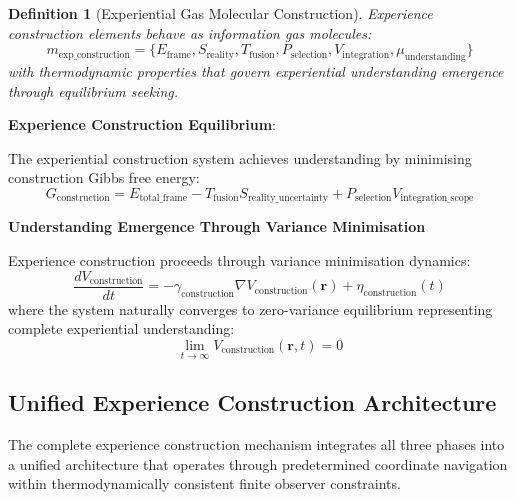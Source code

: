 \documentclass{article}
\newtheorem{definition}[theorem]{Definition}
\begin{document}
\begin{definition}[Experiential Gas Molecular Construction]
Experience construction elements behave as information gas molecules:
\begin{equation}
m_{\text{exp\_construction}} = \{E_{\text{frame}}, S_{\text{reality}}, T_{\text{fusion}}, P_{\text{selection}}, V_{\text{integration}}, \mu_{\text{understanding}}\}
\end{equation}
with thermodynamic properties that govern experiential understanding emergence through equilibrium seeking.
\end{definition}

\textbf{Experience Construction Equilibrium}:

The experiential construction system achieves understanding by minimising construction Gibbs free energy:
\begin{equation}
G_{\text{construction}} = E_{\text{total\_frame}} - T_{\text{fusion}} S_{\text{reality\_uncertainty}} + P_{\text{selection}} V_{\text{integration\_scope}}
\end{equation}

\textbf{Understanding Emergence Through Variance Minimisation}

Experience construction proceeds through variance minimisation dynamics:
\begin{equation}
\frac{dV_{\text{construction}}}{dt} = -\gamma_{\text{construction}} \nabla V_{\text{construction}}(\mathbf{r}) + \eta_{\text{construction}}(t)
\end{equation}
where the system naturally converges to zero-variance equilibrium representing complete experiential understanding:
\begin{equation}
\lim_{t \to \infty} V_{\text{construction}}(\mathbf{r}, t) = 0
\end{equation}

\subsection{Unified Experience Construction Architecture}

The complete experience construction mechanism integrates all three phases into a unified architecture that operates through predetermined coordinate navigation within thermodynamically consistent finite observer constraints.
\end{document}
